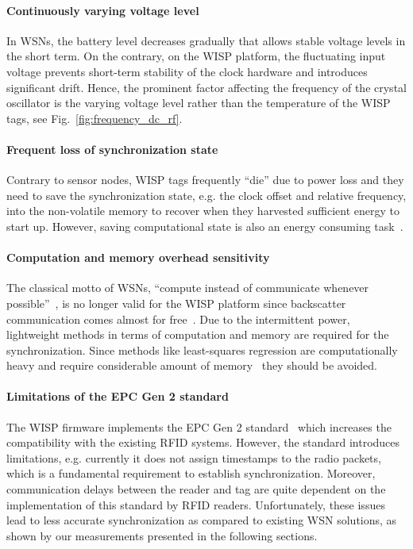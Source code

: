 \documentclass[journal,draftcls,onecolumn,12pt,twoside]{IEEEtranTCOM}
\begin{document}
	
\paragraph{Continuously varying voltage level} In WSNs, the battery level decreases gradually that allows stable voltage levels in the short term. On the contrary, on the WISP platform, the fluctuating input voltage prevents short-term stability of the clock hardware and introduces significant drift. Hence, the prominent factor affecting the frequency of the crystal oscillator is the varying voltage level rather than the temperature of the WISP tags, see Fig.~\ref{fig:frequency_dc_rf}.
	
\paragraph{Frequent loss of synchronization state} Contrary to sensor nodes, WISP tags frequently ``die'' due to power loss and they need to save the synchronization state, e.g. the clock offset and relative frequency, into the non-volatile memory to recover when they harvested sufficient energy to start up. However, saving computational state is also an energy consuming task~\cite{blisp}.
	
\paragraph{Computation and memory overhead sensitivity} The classical motto of WSNs, ``compute instead of communicate whenever possible''~\cite[p. 44]{karl2007protocols}, is no longer valid for the WISP platform since backscatter communication comes almost for free~\cite{ekhonet}. Due to the intermittent power, lightweight methods in terms of computation and memory are required for the synchronization. Since methods like least-squares regression are computationally heavy and require considerable amount of memory~\cite{pi2015} they should be avoided. 
	
\paragraph{Limitations of the EPC Gen 2 standard} The WISP firmware implements the EPC Gen 2 standard~\cite{epc_gen2} which increases the compatibility with the existing RFID systems. However, the standard introduces limitations, e.g. currently it does not assign timestamps to the radio packets, which is a fundamental requirement to establish synchronization. Moreover, communication delays between the reader and tag are quite dependent on the implementation of this standard by RFID readers. Unfortunately, these issues lead to less accurate synchronization as compared to existing WSN solutions, as shown by our measurements presented in the following sections.
\end{document}
